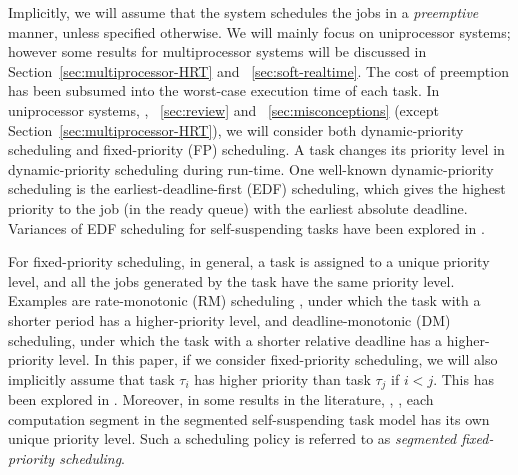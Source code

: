 

Implicitly, we will assume that the system schedules the jobs in a
\emph{preemptive} manner, unless specified otherwise.  We will mainly focus on
uniprocessor systems; however some results for multiprocessor systems
will be discussed in Section~\ref{sec:multiprocessor-HRT} and
\mysectionref{}~\ref{sec:soft-realtime}. 
 The cost of preemption
has been subsumed into the worst-case execution time of each task. In
uniprocessor systems, \ie, \mysectionref{}~\ref{sec:review} and
\mysectionref{}~\ref{sec:misconceptions} (except Section~\ref{sec:multiprocessor-HRT}), we will consider both
dynamic-priority scheduling and fixed-priority (FP)
scheduling. A task changes its priority level in dynamic-priority
scheduling during run-time. One well-known dynamic-priority scheduling
is the earliest-deadline-first (EDF) scheduling, which gives
the highest priority to the job (in the ready queue) with the earliest
absolute deadline. Variances of EDF scheduling for self-suspending
tasks have been explored in
\cite{RTSS-ChenL14,Liu_2014,DBLP:conf/ecrts/Devi03,WC16-suspend-DATE}.

For fixed-priority scheduling, in general, a task is assigned to a
unique priority level, and all the jobs generated by the task have the
same priority level. Examples are rate-monotonic (RM) scheduling
\cite{Liu_1973}, under which the task with a shorter period has a
higher-priority level, and deadline-monotonic (DM) scheduling, under which
the task with a shorter relative deadline has a higher-priority level.
In this paper, if we consider fixed-priority scheduling, we will also implicitly assume that task $\tau_i$ has higher priority than task $\tau_j$ if $i < j$.
This has been explored in
\cite{Raj:suspension1991,RTCSA-KimCPKH95,MingLiRTCSA1994,PH:rtss98,ECRTS-AudsleyB04,RTAS-AudsleyB04,RTCSA-BletsasA05,LR:rtas10,RTSS-KimANR13,LiuChen:rtss2014,huangpass:dac2015,Huang:multiseg,WC16-suspend-DATE,ChenECRTS2016-suspension}.
Moreover, in some results in the literature, \eg,
\cite{RTSS-KimANR13,DBLP:journals/ieicet/DingTT09}, each computation
segment in the segmented self-suspending task model has its own unique
priority level. Such a scheduling
policy is referred to as \emph{segmented fixed-priority scheduling}.

